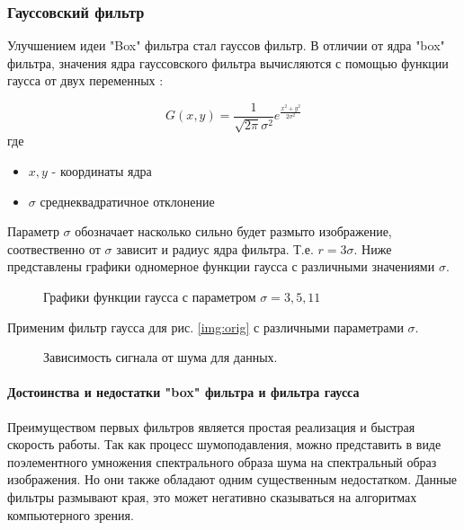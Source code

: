 \subsubsection{Гауссовский фильтр}
Улучшением идеи "Box"  фильтра стал гауссов фильтр. В отличии от ядра "box" фильтра, значения ядра гауссовского фильтра вычисляются с помощью функции гаусса от двух переменных :

\begin{equation}
	G(x,y) = \frac{1}{\sqrt{2\pi}\sigma^2}e^{\frac{x^2+y^2}{2\sigma^2}}
\end{equation}
где
\begin{itemize}
	\item $x,y$ - координаты ядра
	\item $\sigma$ среднеквадратичное отклонение
\end{itemize}

Параметр $\sigma$ обозначает насколько сильно будет размыто изображение, соотвественно от $\sigma$ зависит и радиус ядра фильтра. Т.е. $r=3\sigma$. Ниже представлены графики одномерное функции гаусса с различными значениями $\sigma$.

\begin{figure}[H]
	\caption{Графики функции гаусса с параметром $\sigma = 3,5,11$}
\end{figure}

Применим фильтр гаусса для рис. \ref{img:orig} с различными параметрами $\sigma$.

\begin{figure}[h]
	\begin{minipage}[h]{0.49\linewidth}
	\end{minipage}
	\hfill
	\begin{minipage}[h]{0.49\linewidth}
	\end{minipage}
	\caption{Зависимость сигнала от шума для данных.}
	\label{ris:image1}
\end{figure}

\paragraph{Достоинства и недостатки "box" фильтра и фильтра гаусса}
Преимуществом первых фильтров является простая реализация и быстрая скорость работы. Так как процесс шумоподавления, можно представить в виде поэлементного умножения спектрального образа шума на спектральный образ изображения. Но они также обладают одним существенным недостатком. Данные фильтры размывают края, это может негативно сказываться на алгоритмах компьютерного зрения.
